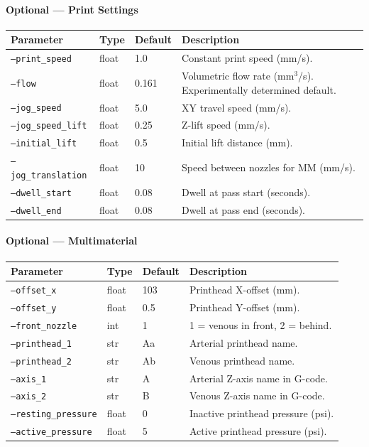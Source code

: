 \documentclass[11pt,letterpaper]{article}
\newcommand{\code}[1]{\texttt{#1}}
\begin{document}
\paragraph{Optional --- Print Settings}

\begin{longtable}{@{}L{3.3cm} l l L{5.5cm}@{}}
\toprule
\textbf{Parameter} & \textbf{Type} & \textbf{Default} & \textbf{Description} \\
\midrule
\code{--print\_speed} & float & 1.0 & Constant print speed (mm/s). \\
\code{--flow} & float & 0.161 & Volumetric flow rate (mm$^3$/s). Experimentally determined default. \\
\code{--jog\_speed} & float & 5.0 & XY travel speed (mm/s). \\
\code{--jog\_speed\_lift} & float & 0.25 & Z-lift speed (mm/s). \\
\code{--initial\_lift} & float & 0.5 & Initial lift distance (mm). \\
\code{--jog\_translation} & float & 10 & Speed between nozzles for MM (mm/s). \\
\code{--dwell\_start} & float & 0.08 & Dwell at pass start (seconds). \\
\code{--dwell\_end} & float & 0.08 & Dwell at pass end (seconds). \\
\bottomrule
\end{longtable}

\paragraph{Optional --- Multimaterial}

\begin{longtable}{@{}L{3.5cm} l l L{5cm}@{}}
\toprule
\textbf{Parameter} & \textbf{Type} & \textbf{Default} & \textbf{Description} \\
\midrule
\code{--offset\_x} & float & 103 & Printhead X-offset (mm). \\
\code{--offset\_y} & float & 0.5 & Printhead Y-offset (mm). \\
\code{--front\_nozzle} & int & 1 & 1 = venous in front, 2 = behind. \\
\code{--printhead\_1} & str & Aa & Arterial printhead name. \\
\code{--printhead\_2} & str & Ab & Venous printhead name. \\
\code{--axis\_1} & str & A & Arterial Z-axis name in G-code. \\
\code{--axis\_2} & str & B & Venous Z-axis name in G-code. \\
\code{--resting\_pressure} & float & 0 & Inactive printhead pressure (psi). \\
\code{--active\_pressure} & float & 5 & Active printhead pressure (psi). \\
\bottomrule
\end{longtable}
\end{document}
